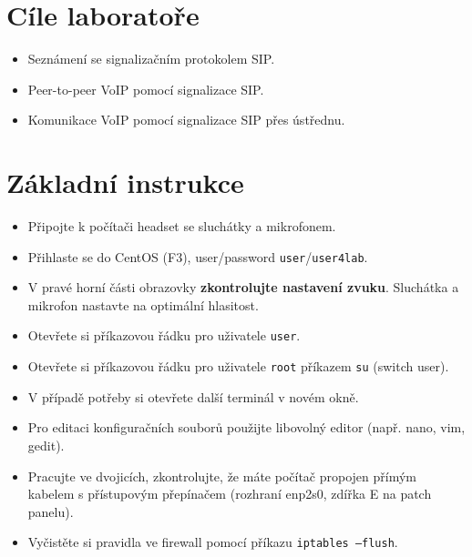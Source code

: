 
\section*{Cíle laboratoře}
\begin{itemize}
  \item Seznámení se signalizačním protokolem SIP.
  \item Peer-to-peer VoIP pomocí signalizace SIP.
  \item Komunikace VoIP pomocí signalizace SIP přes ústřednu.
\end{itemize}

\section*{Základní instrukce}
\begin{itemize}
  \item Připojte k počítači headset se sluchátky a mikrofonem.
  \item Přihlaste se do CentOS (F3), user/password {\tt user}/{\tt user4lab}.
  \item V pravé horní části obrazovky {\bf zkontrolujte nastavení zvuku}. Sluchátka a mikrofon nastavte na optimální hlasitost.
  \item Otevřete si příkazovou řádku pro uživatele {\tt user}.
  \item Otevřete si příkazovou řádku pro uživatele {\tt root} příkazem {\tt su} (switch user).
  \item V případě potřeby si otevřete další terminál v novém okně.
  \item Pro editaci konfiguračních souborů použijte libovolný editor (např. nano, vim, gedit).
  \item Pracujte ve dvojicích, zkontrolujte, že máte počítač propojen
    přímým kabelem s přístupovým přepínačem (rozhraní enp2s0, zdířka E na patch panelu).
  \item Vyčistěte si pravidla ve firewall pomocí příkazu {\tt iptables --flush}.
\end{itemize}

